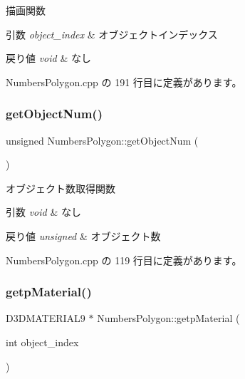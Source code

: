 描画関数 


\begin{DoxyParams}{引数}
{\em object\+\_\+index} & オブジェクトインデックス \\
\hline
\end{DoxyParams}

\begin{DoxyRetVals}{戻り値}
{\em void} & なし \\
\hline
\end{DoxyRetVals}


 Numbers\+Polygon.\+cpp の 191 行目に定義があります。

\mbox{\label{class_numbers_polygon_ac60854b764b6b386d7a2c2b5f927f233}} 
\subsubsection{\texorpdfstring{get\+Object\+Num()}{getObjectNum()}}
{\footnotesize\ttfamily unsigned Numbers\+Polygon\+::get\+Object\+Num (\begin{DoxyParamCaption}{ }\end{DoxyParamCaption})}



オブジェクト数取得関数 


\begin{DoxyParams}{引数}
{\em void} & なし \\
\hline
\end{DoxyParams}

\begin{DoxyRetVals}{戻り値}
{\em unsigned} & オブジェクト数 \\
\hline
\end{DoxyRetVals}


 Numbers\+Polygon.\+cpp の 119 行目に定義があります。

\mbox{\label{class_numbers_polygon_a73430535eec0f86d3502b45405ed8dc0}} 
\subsubsection{\texorpdfstring{getp\+Material()}{getpMaterial()}}
{\footnotesize\ttfamily D3\+D\+M\+A\+T\+E\+R\+I\+A\+L9 $\ast$ Numbers\+Polygon\+::getp\+Material (\begin{DoxyParamCaption}\item[{int}]{object\+\_\+index }\end{DoxyParamCaption})}



